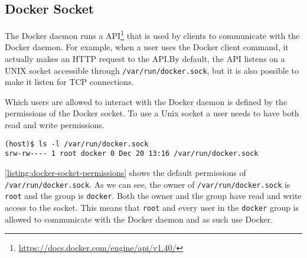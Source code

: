 \subsection{Docker Socket}\label{background:docker-socket}
The Docker daemon runs a API\footnote{\url{https://docs.docker.com/engine/api/v1.40/}} that is used by clients to communicate with the Docker daemon. For example, when a user uses the Docker client command, it actually makes an HTTP request to the API.\@ By default, the API listens on a UNIX socket accessible through \lstinline{/var/run/docker.sock}, but it is also possible to make it listen for TCP connections.

\medskip

Which users are allowed to interact with the Docker daemon is defined by the permissions of the Docker socket. To use a Unix socket a user needs to have both read and write permissions.

\begin{lstlisting}[caption={Default Docker socket permissions.},captionpos=b,label={listing:docker-socket-permissions}]
(host)$ ls -l /var/run/docker.sock
srw-rw---- 1 root docker 0 Dec 20 13:16 /var/run/docker.sock
\end{lstlisting}

\autoref{listing:docker-socket-permissions} shows the default permissions of \lstinline{/var/run/docker.sock}. As we can see, the owner of \lstinline{/var/run/docker.sock} is \lstinline{root} and the group is \lstinline{docker}. Both the owner and the group have read and write access to the socket. This means that \lstinline{root} and every user in the \lstinline{docker} group is allowed to communicate with the Docker daemon and as such use Docker.
